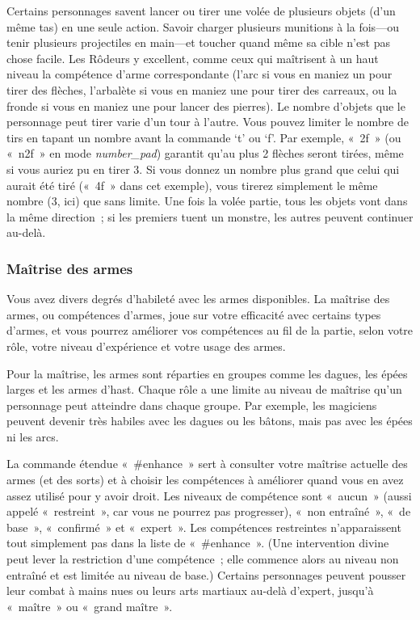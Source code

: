 \documentclass[titlepage]{article}
\begin{document}
Certains personnages savent lancer ou tirer une volée de plusieurs objets
(d'un même tas) en une seule action.
Savoir charger plusieurs munitions à la fois---ou tenir plusieurs
projectiles en main---et toucher quand même sa cible n'est pas chose
facile.
Les Rôdeurs y excellent, comme ceux qui maîtrisent à un haut niveau la
compétence d'arme correspondante (l'arc si vous en maniez un pour tirer
des flèches, l'arbalète si vous en maniez une pour tirer des carreaux, ou
la fronde si vous en maniez une pour lancer des pierres).
Le nombre d'objets que le personnage peut tirer varie d'un tour à l'autre.
Vous pouvez limiter le nombre de tirs en tapant un nombre avant la
commande `t' ou `f'.
Par exemple, «~2f~» (ou «~n2f~» en mode
\textit{number\_pad})
garantit qu'au plus 2 flèches seront tirées, même si vous auriez pu en
tirer 3.
Si vous donnez un nombre plus grand que celui qui aurait été tiré
(«~4f~» dans cet exemple), vous tirerez simplement le même nombre
(3, ici) que sans limite.
Une fois la volée partie, tous les objets vont dans la même direction~; si
les premiers tuent un monstre, les autres peuvent continuer au-delà.

\subsubsection{Maîtrise des armes}



Vous avez divers degrés d'habileté avec les armes disponibles.
La maîtrise des armes, ou compétences d'armes, joue sur votre efficacité
avec certains types d'armes, et vous pourrez améliorer vos compétences au
fil de la partie, selon votre rôle, votre niveau d'expérience et votre
usage des armes.


Pour la maîtrise, les armes sont réparties en groupes comme les dagues,
les épées larges et les armes d'hast.
Chaque rôle a une limite au niveau de maîtrise qu'un personnage peut
atteindre dans chaque groupe.
Par exemple, les magiciens peuvent devenir très habiles avec les dagues ou
les bâtons, mais pas avec les épées ni les arcs.


La commande étendue «~\#enhance~» sert à consulter votre maîtrise
actuelle des armes (et des sorts) et à choisir les compétences à
améliorer quand vous en avez assez utilisé pour y avoir droit.
Les niveaux de compétence sont «~aucun~» (aussi appelé
«~restreint~», car vous ne pourrez pas progresser),
«~non entraîné~», «~de base~», «~confirmé~» et
«~expert~».
Les compétences restreintes n'apparaissent tout simplement pas dans la
liste de «~\#enhance~».
(Une intervention divine peut lever la restriction d'une compétence~; elle
commence alors au niveau non entraîné et est limitée au niveau de base.)
Certains personnages peuvent pousser leur combat à mains nues ou leurs arts
martiaux au-delà d'expert, jusqu'à «~maître~» ou «~grand
maître~».
\end{document}
